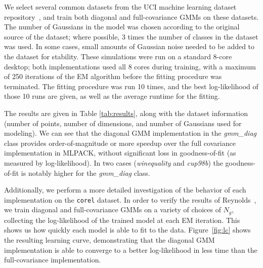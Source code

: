 We select several common datasets from the UCI machine learning dataset
repository~\cite{Lichman_2013}, and train both diagonal and full-covariance
GMMs on these datasets.  The number of Gaussians in the model was chosen
according to the original source of the dataset; where possible, 3 times the
number of classes in the dataset was used.  In some cases, small amounts of
Gaussian noise needed to be added to the dataset for stability.
These simulations were run on a standard 8-core desktop; both implementations
used all 8 cores during training, with a maximum of 250 iterations of the EM
algorithm before the fitting procedure was terminated.  The fitting procedure
was run 10 times, and the best log-likelihood of those 10 runs are given, as
well as the average runtime for the fitting.

The results are given in Table \ref{tab:results}, along with the dataset
information (number of points, number of dimensions, and number of Gaussians
used for modeling).  We can see that the diagonal GMM implementation in 
the {\it gmm\_diag} class provides order-of-magnitude or more speedup over the full covariance
implementation in MLPACK, without significant loss in goodness-of-fit (as measured by log-likelihood).
In two cases ({\it winequality} and {\it cup98b}) the goodness-of-fit is notably higher for the {\it gmm\_diag} class.

Additionally, we perform a more detailed investigation of the behavior of each
implementation on the {\tt corel} dataset.  In order to verify the results of
Reynolds~\cite{Reynolds_2000}, we train diagonal and full-covariance GMMs on a
variety of choices of $N_g$, collecting the log-likelihood of the trained model
at each EM iteration.  This shows us how quickly each model is able to fit to
the data.  Figure~\ref{fig:lc} shows the resulting learning curve, demonstrating
that the diagonal GMM implementation is able to converge to a better
log-likelihood in less time than the full-covariance implementation.

\begin{figure*}
\begin{center}
\end{center}
\caption{GMM training time vs. log-likelihood of model for diagonal GMMs (blue)
and non-diagonal GMMs (red).  The simulation is performed for many values of
$N_g$, showing that for the {\tt corel} dataset, we can get a faster and better
fit with our implementation of diagonal GMMs than with a full-covariance GMM,
even when the diagonal GMM must have a greater $N_g$ to achieve a better fit.}
\label{fig:lc}
\end{figure*}
